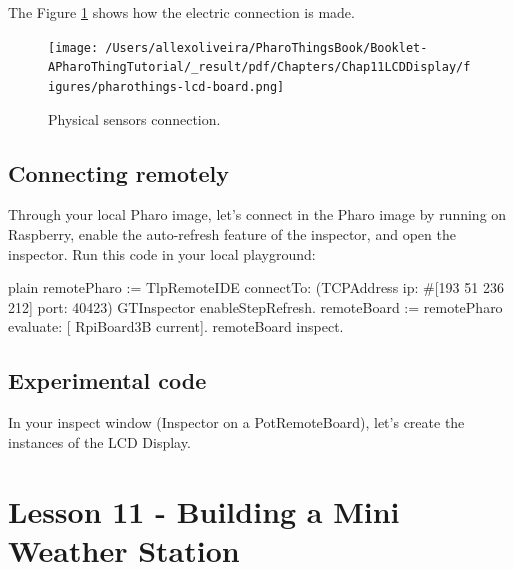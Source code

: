 \documentclass[10pt,twoside,english]{_support/latex/sbabook/sbabook}
\begin{document}
The Figure \ref{physicalLCD} shows how the electric connection is made.


\begin{figure}

\begin{center}
\texttt{[image: /Users/allexoliveira/PharoThingsBook/Booklet-APharoThingTutorial/\_result/pdf/Chapters/Chap11LCDDisplay/figures/pharothings-lcd-board.png]}\caption{Physical sensors connection.\label{physicalLCD}}\end{center}
\end{figure}

\section{Connecting remotely}
Through your local Pharo image, let’s connect in the Pharo image by running on Raspberry, enable the auto-refresh feature of the inspector, and open the inspector.
Run this code in your local playground:

\begin{displaycode}{plain}
remotePharo := TlpRemoteIDE connectTo: (TCPAddress ip: #[193 51 236 212] port: 40423)
GTInspector enableStepRefresh.
remoteBoard := remotePharo evaluate: [ RpiBoard3B current].
remoteBoard inspect.
\end{displaycode}
\section{Experimental code}
In your inspect window (Inspector on a PotRemoteBoard), let’s create the instances of the LCD Display. 
\chapter{Lesson 11 - Building a Mini Weather Station}

\backmatter

\end{document}
